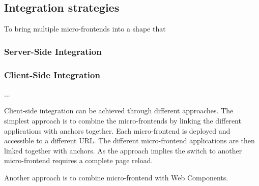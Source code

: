 \subsection{Integration strategies}

To bring multiple micro-frontends into a shape that 

\subsubsection{Server-Side Integration}




\subsubsection{Client-Side Integration}

...

Client-side integration can be achieved through different approaches. The simplest approach is to combine the micro-frontends by linking the different applications with anchors together. Each micro-frontend is deployed and accessible to a different URL. The different micro-frontend applications are then linked together with anchors. As the approach implies the switch to another micro-frontend requires a complete page reload. 

Another approach is to combine micro-frontend with Web Components.
